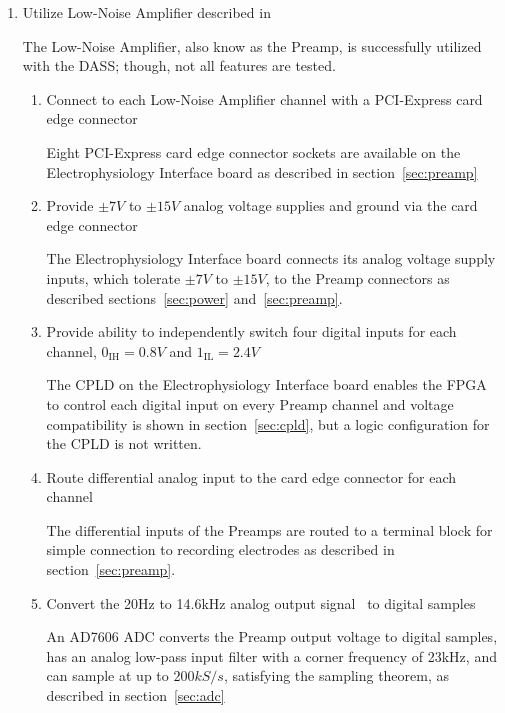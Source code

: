 \begin{enumerate}
\begin{enumerate}
	\end{enumerate}

\item Utilize Low-Noise Amplifier described in~\cite{StahlMSEE}

The Low-Noise Amplifier, also know as the Preamp, is successfully utilized with the DASS; though, not all features are tested.

	\begin{enumerate}
	
	\item Connect to each Low-Noise Amplifier channel with a PCI-Express card edge connector
	
	Eight PCI-Express card edge connector sockets are available on the Electrophysiology Interface board as described in section~\ref{sec:preamp}
	
	\item Provide $\pm 7\unit{V}$ to $\pm 15\unit{V}$ analog voltage supplies and ground via the card edge connector
	
	The Electrophysiology Interface board connects its analog voltage supply inputs, which tolerate $\pm 7\unit{V}$ to $\pm 15\unit{V}$, to the Preamp connectors as described sections~\ref{sec:power} and~\ref{sec:preamp}.
	
	\item Provide ability to independently switch four digital inputs for each channel, $0_{\mathrm{IH}}=0.8\unit{V}$ and $1_{\mathrm{IL}}=2.4\unit{V}$
	
	The CPLD on the Electrophysiology Interface board enables the FPGA to control each digital input on every Preamp channel and voltage compatibility is shown in section~\ref{sec:cpld}, but a logic configuration for the CPLD is not written.
	
	\item Route differential analog input to the card edge connector for each channel
	
	The differential inputs of the Preamps are routed to a terminal block for simple connection to recording electrodes as described in section~\ref{sec:preamp}.
	
	\item Convert the 20Hz to 14.6kHz analog output signal~\cite{StahlMSEE} to digital samples %
	
	An AD7606 ADC converts the Preamp output voltage to digital samples, has an analog low-pass input filter with a corner frequency of 23kHz, and can sample at up to $200\unit{kS}/\unit{s}$, satisfying the sampling theorem, as described in section~\ref{sec:adc}
	

\end{enumerate}
\end{enumerate}

